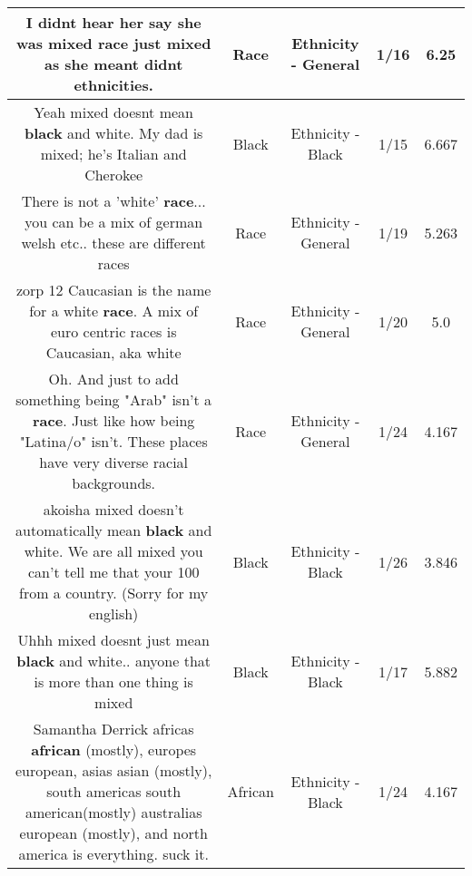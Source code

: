 \documentclass[11pt]{article}
\newlength\mylength
\begin{document}
\begin{center}
\begin{longtable}{|C{.65\mylength}|C{.30\mylength}|C{.12\mylength}|C{.12\mylength}|C{.12\mylength}|}
  \small I didnt hear her say she was mixed \textbf{race} just mixed as she meant didnt ethnicities.\normalsize   & Race & Ethnicity - General & 1/16 & 6.25 \\  \hline
  \small Yeah mixed doesnt mean \textbf{black} and white. My dad is mixed; he's Italian and Cherokee\normalsize   & Black & Ethnicity - Black & 1/15 & 6.667 \\  \hline
  \small There is not a 'white' \textbf{race}... you can be a mix of german welsh etc.. these are different races\normalsize   & Race & Ethnicity - General & 1/19 & 5.263 \\  \hline
  \small zorp 12 Caucasian is the name for a white \textbf{race}. A mix of euro centric races is Caucasian, aka white\normalsize   & Race & Ethnicity - General & 1/20 & 5.0 \\  \hline
  \small Oh. And just to add something being "Arab" isn't a \textbf{race}. Just like how being "Latina/o" isn't. These places have very diverse racial backgrounds.\normalsize   & Race & Ethnicity - General & 1/24 & 4.167 \\  \hline
  \small akoisha mixed doesn't automatically mean \textbf{black} and white. We are all mixed you can't tell me that your 100 from a country. (Sorry for my english)\normalsize   & Black & Ethnicity - Black & 1/26 & 3.846 \\  \hline
  \small Uhhh mixed doesnt just mean \textbf{black} and white.. anyone that is more than one thing is mixed\normalsize   & Black & Ethnicity - Black & 1/17 & 5.882 \\  \hline
  \small Samantha Derrick africas \textbf{african} (mostly), europes european, asias asian (mostly), south americas south american(mostly) australias european (mostly), and north america is everything. suck it.\normalsize   & African & Ethnicity - Black & 1/24 & 4.167 \\  \hline

\end{longtable}
\end{center}
\end{document}
